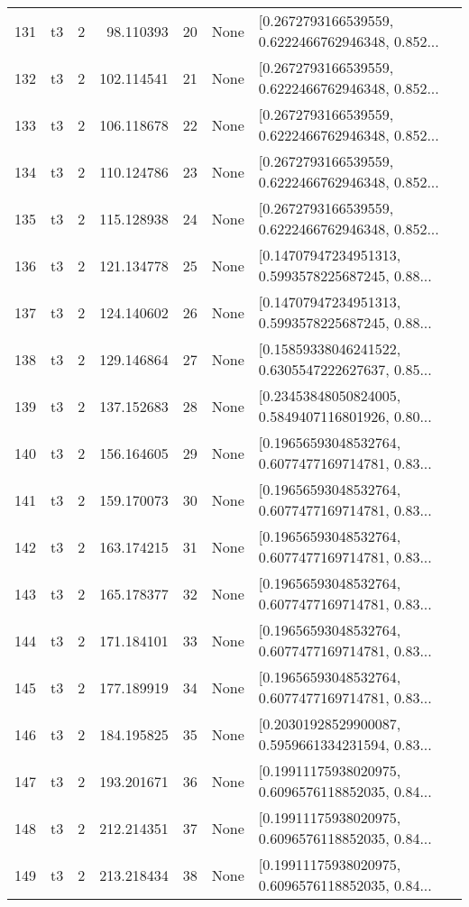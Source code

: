 \begin{tabular}{lllrlll}
131 &  t3 &   2 &   98.110393 &   20 &  None &  [0.2672793166539559, 0.6222466762946348, 0.852... \\
132 &  t3 &   2 &  102.114541 &   21 &  None &  [0.2672793166539559, 0.6222466762946348, 0.852... \\
133 &  t3 &   2 &  106.118678 &   22 &  None &  [0.2672793166539559, 0.6222466762946348, 0.852... \\
134 &  t3 &   2 &  110.124786 &   23 &  None &  [0.2672793166539559, 0.6222466762946348, 0.852... \\
135 &  t3 &   2 &  115.128938 &   24 &  None &  [0.2672793166539559, 0.6222466762946348, 0.852... \\
136 &  t3 &   2 &  121.134778 &   25 &  None &  [0.14707947234951313, 0.5993578225687245, 0.88... \\
137 &  t3 &   2 &  124.140602 &   26 &  None &  [0.14707947234951313, 0.5993578225687245, 0.88... \\
138 &  t3 &   2 &  129.146864 &   27 &  None &  [0.15859338046241522, 0.6305547222627637, 0.85... \\
139 &  t3 &   2 &  137.152683 &   28 &  None &  [0.23453848050824005, 0.5849407116801926, 0.80... \\
140 &  t3 &   2 &  156.164605 &   29 &  None &  [0.19656593048532764, 0.6077477169714781, 0.83... \\
141 &  t3 &   2 &  159.170073 &   30 &  None &  [0.19656593048532764, 0.6077477169714781, 0.83... \\
142 &  t3 &   2 &  163.174215 &   31 &  None &  [0.19656593048532764, 0.6077477169714781, 0.83... \\
143 &  t3 &   2 &  165.178377 &   32 &  None &  [0.19656593048532764, 0.6077477169714781, 0.83... \\
144 &  t3 &   2 &  171.184101 &   33 &  None &  [0.19656593048532764, 0.6077477169714781, 0.83... \\
145 &  t3 &   2 &  177.189919 &   34 &  None &  [0.19656593048532764, 0.6077477169714781, 0.83... \\
146 &  t3 &   2 &  184.195825 &   35 &  None &  [0.20301928529900087, 0.5959661334231594, 0.83... \\
147 &  t3 &   2 &  193.201671 &   36 &  None &  [0.19911175938020975, 0.6096576118852035, 0.84... \\
148 &  t3 &   2 &  212.214351 &   37 &  None &  [0.19911175938020975, 0.6096576118852035, 0.84... \\
149 &  t3 &   2 &  213.218434 &   38 &  None &  [0.19911175938020975, 0.6096576118852035, 0.84... \\

\end{tabular}

